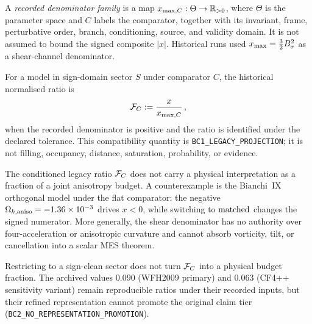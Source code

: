 \begin{definition}
\label{def:ceiling-family}
 A \emph{recorded denominator family} is a map
$x_{\max,C}: \Theta \to \mathbb{R}_{>0}$,
where $\Theta$ is the parameter space and $C$ labels the
comparator, together with its invariant, frame, perturbative order,
branch, conditioning, source, and validity domain.  It is not assumed
to bound the signed composite $|x|$.  Historical runs used
$x_{\max}=\frac{3}{2}B_\sigma^2$ as a shear-channel denominator.
\end{definition}

\begin{definition}
\label{def:FC}
For a model in sign-domain sector $S$ under comparator $C$,
the historical normalised ratio is
\begin{equation}\label{eq:FC-def}
\mathcal{F}_C := \frac{x}{x_{\max,C}}\,,
\end{equation}
when the recorded denominator is positive and the ratio is
identified under the declared tolerance.  This compatibility
quantity is \texttt{BC1\_LEGACY\_PROJECTION}; it is not filling,
occupancy, distance, saturation, probability, or evidence.
\end{definition}

\begin{proposition}
\label{prop:FC-no-auto}
The conditioned legacy ratio $\mathcal{F}_C$ does not carry a physical
interpretation as a fraction of a joint anisotropy budget.  A
counterexample is
the Bianchi~IX orthogonal model under the flat comparator: the
negative $\Omega_{k,\mathrm{aniso}} = -1.36 \times 10^{-3}$ drives $x < 0$,
while switching to $\mathrm{matched}$ changes the signed numerator.
More generally, the shear denominator has no authority over
four-acceleration or anisotropic curvature and cannot absorb
vorticity, tilt, or cancellation into a scalar MES theorem.
\end{proposition}

\begin{proposition}\label{prop:FC-certified}
Restricting to a sign-clean sector does not turn $\mathcal{F}_C$ into a
physical budget fraction.  The archived values
$0.090$ (WFH2009 primary) and $0.063$ (CF4++ sensitivity
variant) remain reproducible ratios under their recorded inputs,
but their refined representation cannot promote the original
claim tier
(\texttt{BC2\_NO\_REPRESENTATION\_PROMOTION}).
\end{proposition}

